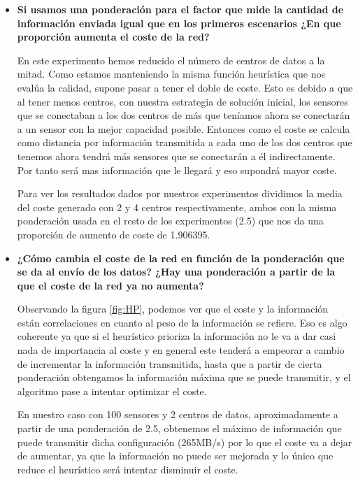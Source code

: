\documentclass{article}
\begin{document}
\begin{enumerate}
\begin{itemize}
    \item \textbf{Si usamos una ponderación para el factor que mide la cantidad de información enviada igual que en los primeros escenarios ¿En que proporción aumenta el coste de la red?}\par
    En este experimento hemos reducido el número de centros de datos a la mitad. Como estamos manteniendo la misma función heurística que nos evalúa la calidad, supone pasar a tener el doble de coste. Esto es debido a que al tener menos centros, con nuestra estrategia de solución inicial, los sensores que se conectaban a los dos centros de más que teníamos ahora se conectarán a un sensor con la mejor capacidad posible. Entonces como el coste se calcula como distancia por información transmitida a cada uno de los dos centros que tenemos ahora tendrá más sensores que se conectarán a él indirectamente. Por tanto será mas información que le llegará y eso supondrá mayor coste. \par
    Para ver los resultados dados por nuestros experimentos dividimos la media del coste generado con 2 y 4 centros respectivamente, ambos con la misma ponderación usada en el resto de los experimentos (2.5) que nos da una proporción de aumento de coste de 1.906395.
    \item \textbf{¿Cómo cambia el coste de la red en función de la ponderación que se da al envío de los datos? ¿Hay una ponderación a partir de la que el coste de la red ya no aumenta?}\par
    Observando la figura \ref{fig:HP}, podemos ver que el coste y la información están correlaciones en cuanto al peso de la información se refiere. Eso es algo coherente ya que si el heurístico prioriza la información no le va a dar casi nada de importancia al coste y en general este tenderá a empeorar a cambio de incrementar la información transmitida, hasta que a partir de cierta ponderación obtengamos la información máxima que se puede transmitir, y el algoritmo pase a intentar optimizar el coste.\par
    En nuestro caso con 100 sensores y 2 centros de datos, aproximadamente a partir de una ponderación de 2.5, obtenemos el máximo de información que puede transmitir dicha configuración (265MB/s) por lo que el coste va a dejar de aumentar, ya que la información no puede ser mejorada y lo único que reduce el heurístico será intentar disminuir el coste.
  \end{itemize}
\end{enumerate}
\end{document}
